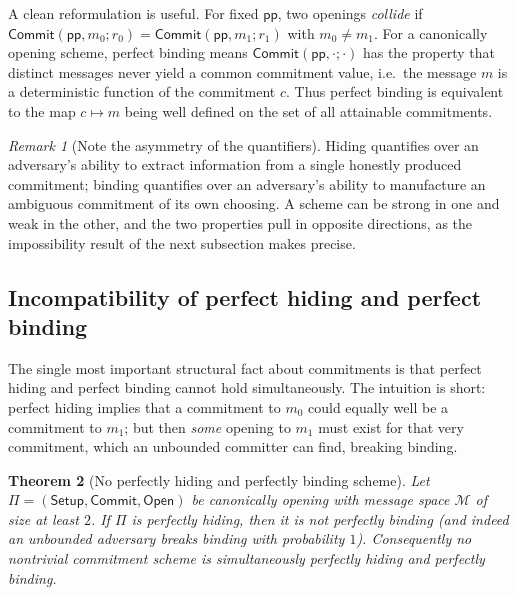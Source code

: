 \documentclass[11pt,a4paper]{article}
\newtheorem{theorem}{Theorem}[section]
\theoremstyle{definition}
\theoremstyle{remark}
\newtheorem{remark}[theorem]{Remark}
\begin{document}
A clean reformulation is useful. For fixed \(\mathsf{pp}\), two openings \emph{collide} if \(\mathsf{Commit}(\mathsf{pp}, m_0; r_0) = \mathsf{Commit}(\mathsf{pp}, m_1; r_1)\) with \(m_0 \neq m_1\). For a canonically opening scheme, perfect binding means \(\mathsf{Commit}(\mathsf{pp}, \cdot; \cdot)\) has the property that distinct messages never yield a common commitment value, i.e.\ the message \(m\) is a deterministic function of the commitment \(c\). Thus perfect binding is equivalent to the map \(c \mapsto m\) being well defined on the set of all attainable commitments.

\begin{remark}[Note the asymmetry of the quantifiers]\label{commitments:rem:asymmetry}
Hiding quantifies over an adversary's ability to extract information from a single honestly produced commitment; binding quantifies over an adversary's ability to manufacture an ambiguous commitment of its own choosing. A scheme can be strong in one and weak in the other, and the two properties pull in opposite directions, as the impossibility result of the next subsection makes precise.
\end{remark}

\subsection{Incompatibility of perfect hiding and perfect binding}\label{commitments:subsec:impossibility}

The single most important structural fact about commitments is that perfect hiding and perfect binding cannot hold simultaneously. The intuition is short: perfect hiding implies that a commitment to \(m_0\) could equally well be a commitment to \(m_1\); but then \emph{some} opening to \(m_1\) must exist for that very commitment, which an unbounded committer can find, breaking binding.

\begin{theorem}[No perfectly hiding and perfectly binding scheme]\label{commitments:thm:impossibility}
Let \(\Pi = (\mathsf{Setup}, \mathsf{Commit}, \mathsf{Open})\) be canonically opening with message space \(\mathcal{M}\) of size at least \(2\). If \(\Pi\) is perfectly hiding, then it is not perfectly binding (and indeed an unbounded adversary breaks binding with probability \(1\)). Consequently no nontrivial commitment scheme is simultaneously perfectly hiding and perfectly binding.
\end{theorem}
\end{document}
